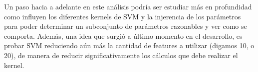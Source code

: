 Un paso hacia a adelante en este análisis podría ser estudiar más en profundidad como influyen los diferentes kernels de SVM y la injerencia de los parámetros para poder determinar un subconjunto de parámetros razonables y ver como se comporta. Además, una idea que surgió a último momento en el desarrollo, es probar SVM reduciendo aún más la cantidad de features a utilizar (digamos 10, o 20), de manera de reducir significativamente los cálculos que debe realizar el kernel.



